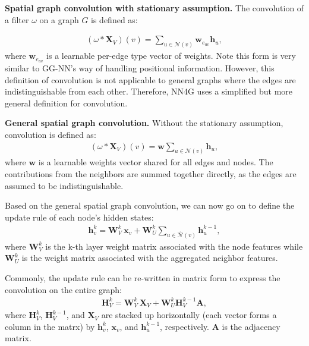\vspace{2mm}
\noindent \textbf{Spatial graph convolution with stationary assumption.} The convolution of a filter $\omega$ on a graph $G$ is defined as:

\begin{gather}
(\omega \ast \mathbf{X}_V) (v) = \sum_{u \in \mathcal {N}(v)} \mathbf{w}_{e_{uv}} \mathbf{h}_u,
\end{gather}
where $\mathbf{w}_{e_{uv}}$ is a learnable per-edge type vector of weights. Note this form is very similar to GG-NN's way of handling positional information. However, this definition of convolution is not applicable to general graphs where the edges are indistinguishable from each other. Therefore, NN4G uses a simplified but more general definition for convolution.

\vspace{2mm}
\noindent \textbf{General spatial graph convolution.} Without the stationary assumption, convolution is defined as:
\begin{gather}
(\omega \ast \mathbf{X}_V) (v)= \mathbf{w} \sum_{u \in \mathcal {N}(v)} \mathbf{h}_u,
\end{gather}
where $\mathbf{w}$ is a learnable weights vector shared for all edges and nodes. The contributions from the neighbors are summed together directly, as the edges are assumed to be indistinguishable. 

Based on the general spatial graph convolution, we can now go on to define the update rule of each node's hidden states:
\begin{gather}
\label{eq:nn4g}
\mathbf{h}_v ^k = \mathbf{W}_V^k~\mathbf{x}_v + \mathbf{W}_U^k \sum_{u \in \hat {\mathcal {N}}(v)} \mathbf{h}_u^{k-1},
\end{gather}
where $\mathbf{W}_V^k$ is the k-th layer weight matrix associated with the node features while $\mathbf{W}_U^k$ is the weight matrix associated with the aggregated neighbor features.

Commonly, the update rule can be re-written in matrix form to express the convolution on the entire graph:
\begin{gather}
\label{eq:nn4gm}
\mathbf{H}_V^k = \mathbf{W}_V^k~\mathbf{X}_V + \mathbf{W}_U^k \mathbf{H}_V^{k-1} \mathbf{A} ,
\end{gather}
where $\mathbf{H}_V^k$, $\mathbf{H}_V^{k-1}$, and $\mathbf{X}_V$ are stacked up horizontally (each vector forms a column in the matrx) by $\mathbf{h}_v ^k$, $\mathbf{x}_v$, and $\mathbf{h}_u^{k-1}$, respectively. $\mathbf{A}$ is the adjacency matrix.

